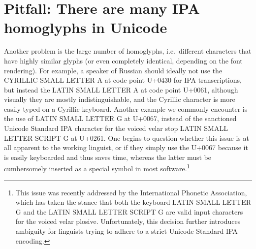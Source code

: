 \section{Pitfall: There are many IPA homoglyphs in Unicode}
\label{pitfall-there-are-many-ipa-homoglyphs-in-unicode}

Another problem is the large number of homoglyphs, i.e.~different characters that have highly similar glyphs (or even completely identical, depending on the font rendering). For example, a speaker of Russian should ideally not use the CYRILLIC SMALL LETTER A at code point U+0430 for IPA transcriptions, but instead the LATIN SMALL LETTER A at code point U+0061, although visually they are mostly indistinguishable, and the Cyrillic character is more easily typed on a Cyrillic keyboard. Another example we commonly encounter is the use of LATIN SMALL LETTER G at U+0067, instead of the sanctioned Unicode Standard IPA character for the voiced velar stop LATIN SMALL LETTER SCRIPT G at U+0261. One begins to question whether this issue is at all apparent to the working linguist, or if they simply use the U+0067 because it is easily keyboarded and thus saves time, whereas the latter must be cumbersomely inserted as a special symbol in most software.\footnote{This issue was recently addressed by the International Phonetic Association, which has taken the stance that both the keyboard LATIN SMALL LETTER G and the LATIN SMALL LETTER SCRIPT G are valid input characters for the voiced velar plosive. Unfortunately, this decision further introduces ambiguity for linguists trying to adhere to a strict Unicode Standard IPA encoding.}

